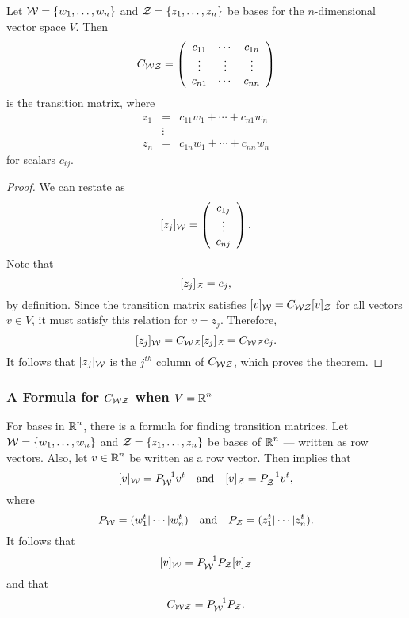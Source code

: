 \documentclass{ximera}
\begin{document}
\begin{theorem}  \label{T:coordform}
Let ${\cal W}=\{w_1,\ldots,w_n\}$ and ${\cal Z}=\{z_1,\ldots,z_n\}$
be bases for the $n$-dimensional vector space $V$.
Then
\begin{equation} \label{e:coordform}
C_{{\cal W}{\cal Z}} =
\left(\begin{array}{ccc} c_{11} & \cdots & c_{1n} \\
\vdots & \vdots & \vdots \\
c_{n1} & \cdots & c_{nn} \end{array}\right)
\end{equation}
is the transition matrix, where
\begin{equation} \label{e:wtoz}
\begin{array}{ccc}
z_1 & = & c_{11}w_1 + \cdots + c_{n1}w_n \nonumber \\
    & \vdots &  \\
z_n & = & c_{1n}w_1 + \cdots + c_{nn}w_n \nonumber
\end{array}
\end{equation}
for scalars $c_{ij}$.
\end{theorem}

\begin{proof}
We can restate  as
\[
[z_j]_{\cal W} = \left(\begin{array}{c} c_{1j} \\ \vdots \\c_{nj}
\end{array} \right).
\]
Note that
\[
[z_j]_{\cal Z} = e_j,
\]
by definition.  Since the transition matrix satisfies
$[v]_{\cal W} =  C_{{\cal W}{\cal Z}}[v]_{\cal Z}$ for all vectors
$v\in V$, it must satisfy this relation for $v=z_j$.  Therefore,
\[
[z_j]_{\cal W} = C_{{\cal W}{\cal Z}}[z_j]_{\cal Z} = C_{{\cal W}{\cal Z}}e_j.
\]
It follows that $[z_j]_{\cal W}$ is the $j^{th}$ column of
$C_{{\cal W}{\cal Z}}$, which proves the theorem.  \end{proof}

\subsubsection*{A Formula for $C_{\cal WZ}$ when $V=\mbox{$\Bbb{R}$}^n$}

For bases in $\mbox{$\Bbb{R}$}^n$, there is a formula for finding transition
matrices.  Let ${\cal W} =\{w_1,\ldots,w_n\}$
and ${\cal Z} = \{z_1,\ldots,z_n\}$ be bases of $\mbox{$\Bbb{R}$}^n$ --- written as row
vectors.
Also, let $v\in\mbox{$\Bbb{R}$}^n$ be written as a row vector.  Then 
implies that
\[
[v]_{\cal W} = P_{\cal W}^{-1} v^t \quad\mbox{and}\quad [v]_{\cal Z} = P_{\cal Z}^{-1} v^t,
\]
where
\[
P_{\cal W} = (w_1^t|\cdots|w_n^t) \quad\mbox{and}\quad  P_{\cal Z} = (z_1^t|\cdots|z_n^t).
\]
It follows that
\[
[v]_{\cal W} = P_{\cal W}^{-1} P_{\cal Z} [v]_{\cal Z}
\]
and that
\begin{equation} \label{e:coordformn}
C_{\cal WZ} = P_{\cal W}^{-1} P_{\cal Z}.
\end{equation}
\end{document}
